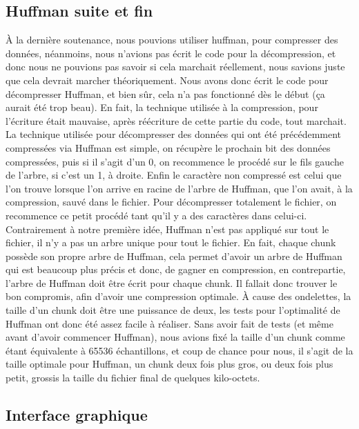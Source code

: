 \documentclass[a4paper,12pt]{article}
\begin{document}
	\subsection{Huffman suite et fin}
À la dernière soutenance, nous pouvions utiliser huffman, pour compresser des
données, néanmoins, nous n'avions pas écrit le code pour la décompression, et
donc nous ne pouvions pas savoir si cela marchait réellement, nous savions juste
que cela devrait marcher théoriquement. Nous avons donc écrit le code pour
décompresser Huffman, et bien sûr, cela n'a pas fonctionné dès le début (ça
aurait été trop beau). En fait, la technique utilisée à la compression, pour
l'écriture était mauvaise, après réécriture de cette partie du code, tout
marchait.\\
La technique utilisée pour décompresser des données qui ont été précédemment
compressées via Huffman est simple, on récupère le prochain bit des données
compressées, puis si il s'agit d'un 0, on recommence le procédé sur le fils
gauche de l'arbre, si c'est un 1, à droite. Enfin le caractère non compressé est
celui que l'on trouve lorsque l'on arrive en racine de l'arbre de Huffman, que
l'on avait, à la compression, sauvé dans le fichier. Pour décompresser
totalement le fichier, on recommence ce petit
procédé tant qu'il y a des caractères dans celui-ci.\\
Contrairement à notre première idée, Huffman n'est pas appliqué sur tout le
fichier, il n'y a pas un arbre unique pour tout le fichier. En fait, chaque
chunk possède son propre arbre de Huffman, cela permet d'avoir un arbre de
Huffman qui est beaucoup plus précis et donc, de gagner en compression, en
contrepartie, l'arbre de
Huffman doit être écrit pour chaque chunk. Il fallait donc trouver le bon
compromis, afin d'avoir une compression optimale. À cause des ondelettes, la
taille d'un chunk doit être une puissance de deux, les tests pour l'optimalité
de Huffman ont donc été assez facile à réaliser. Sans avoir fait de tests (et
même avant d'avoir commencer Huffman), nous avions fixé la taille d'un chunk
comme étant équivalente à 65536 échantillons, et coup de chance pour nous, il
s'agit de la taille optimale pour Huffman, un chunk deux fois plus gros, ou deux
fois plus petit, grossis la taille du fichier final de quelques
kilo-octets.\\
	\subsection{Interface graphique}
\end{document}
